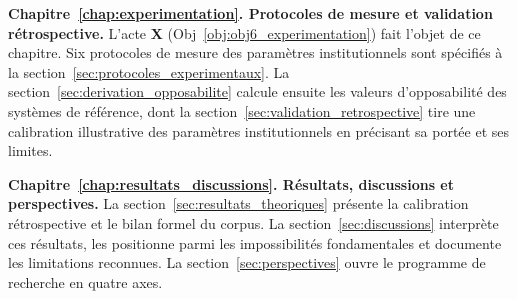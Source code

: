 \begin{sloppypar}
\textbf{Chapitre~\ref{chap:experimentation}. Protocoles de mesure et validation r\'etrospective.}
L'acte \textbf{X} (Obj~\ref{obj:obj6_experimentation}) fait l'objet de ce chapitre.
Six protocoles de mesure des param\`etres institutionnels sont sp\'ecifi\'es \`a la
section~\ref{sec:protocoles_experimentaux}. La
section~\ref{sec:derivation_opposabilite} calcule ensuite les valeurs d'opposabilit\'e
des syst\`emes de r\'ef\'erence, dont la
section~\ref{sec:validation_retrospective} tire une calibration
illustrative des param\`etres institutionnels en pr\'ecisant sa port\'ee et
ses limites.

\textbf{Chapitre~\ref{chap:resultats_discussions}. R\'esultats, discussions et perspectives.}
La section~\ref{sec:resultats_theoriques} pr\'esente la calibration
r\'etrospective et le bilan formel du corpus. La
section~\ref{sec:discussions} interpr\`ete ces r\'esultats, les positionne
parmi les impossibilit\'es fondamentales et documente les limitations
reconnues. La section~\ref{sec:perspectives} ouvre le programme de recherche
en quatre axes.

\end{sloppypar}